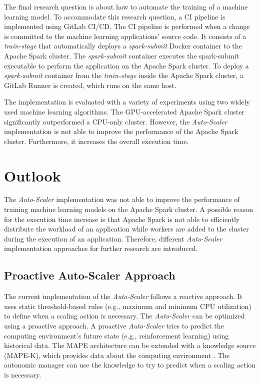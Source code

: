 The final research question is about how to automate the training of a machine learning model.
%
To accommodate this research question, a CI pipeline is implemented using GitLab CI/CD. The CI pipeline is performed when a change is committed to the machine learning applications' source code.
It consists of a \textit{train-stage} that automatically deploys a \textit{spark-submit} Docker container to the Apache Spark cluster.
The \textit{spark-submit} container executes the spark-submit executable to perform the application on the Apache Spark cluster.
To deploy a \textit{spark-submit} container from the \textit{train-stage} inside the Apache Spark cluster, a GitLab Runner is created, which runs on the same host.


The implementation is evaluated with a variety of experiments using two widely used machine learning algorithms.
The GPU-accelerated Apache Spark cluster significantly outperformed a CPU-only cluster.
However, the \textit{Auto-Scaler} implementation is not able to improve the performance of the Apache Spark cluster. Furthermore, it increases the overall execution time.


\section{Outlook}
The \textit{Auto-Scaler} implementation was not able to improve the performance of training machine learning models on the Apache Spark cluster.
A possible reason for the execution time increase is that Apache Spark is not able to efficiently distribute the workload of an application while workers are added to the cluster during the execution of an application.
Therefore, different \textit{Auto-Scaler} implementation approaches for further research are introduced.


\subsection{Proactive Auto-Scaler Approach}
The current implementation of the \textit{Auto-Scaler} follows a reactive approach. It uses static threshold-based rules (e.g., maximum and minimum CPU utilization) to define when a scaling action is necessary.
The \textit{Auto-Scaler} can be optimized using a proactive approach. A proactive \textit{Auto-Scaler} tries to predict the computing environment's future state (e.g., reinforcement learning) using historical data.
The MAPE architecture can be extended with a knowledge source (MAPE-K), which provides data about the computing environment \cite{Sinreich2006AnAB}. The autonomic manager can use the knowledge to try to predict when a scaling action is necessary.


